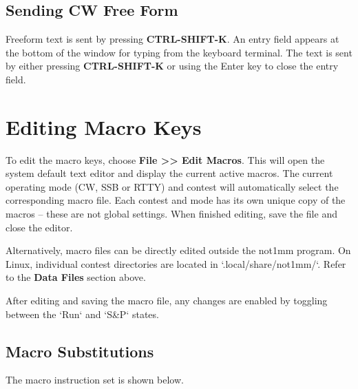 \documentclass{article}
\begin{document}
\subsection{Sending CW Free Form}
Freeform text is sent by pressing \textbf{CTRL-SHIFT-K}. An entry field appears at the bottom of the window for typing from the keyboard terminal. The text is sent by either pressing \textbf{CTRL-SHIFT-K} or using the Enter key to close the entry field.
\newpage
\section{Editing Macro Keys}
To edit the macro keys, choose \textbf{File >> Edit Macros}. This will open the system default text editor and display the current active macros.   The current operating mode (CW, SSB or RTTY) and contest will automatically select the corresponding macro file. Each contest and mode has its own unique copy of the macros -- these are not global settings. When finished editing, save the file and close the editor.

Alternatively, macro files can be directly edited outside the not1mm program. On Linux, individual contest directories are located in `.local/share/not1mm/`. Refer to the \textbf{Data Files} section above.

After editing and saving the macro file, any changes are enabled by toggling between the `Run` and `S\&P` states.


\subsection{Macro Substitutions}

The macro instruction set is shown below.
\end{document}
